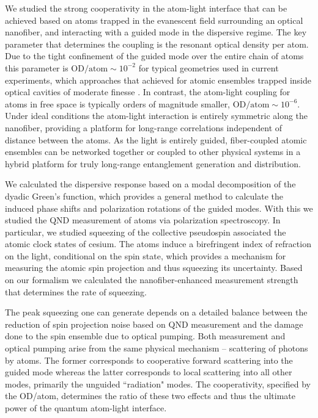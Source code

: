 \documentclass[aps,pra,twocolumn]{revtex4-1} %
\begin{document}
We studied the strong cooperativity in the atom-light interface that can be achieved based on atoms trapped in the evanescent field surrounding an optical nanofiber, and interacting with a guided mode in the dispersive regime. 
The key parameter that determines the coupling is the resonant optical density per atom. 
Due to the tight confinement of the guided mode over the entire chain of atoms this parameter is $ \mathrm{OD}/\mathrm{atom}\sim 10^{-2} $ for typical geometries used in current experiments, which approaches that achieved for atomic ensembles trapped inside optical cavities of moderate finesse \cite{chen_conditional_2011, zhang_collective_2012}.  
In contrast, the atom-light coupling for atoms in free space is typically orders of magnitude smaller, $ \mathrm{OD}/\mathrm{atom} \sim 10^{-6}$.  
Under ideal conditions the atom-light interaction is entirely symmetric along the nanofiber, providing a platform for long-range correlations independent of distance between the atoms. 
As the light is entirely guided, fiber-coupled atomic ensembles can be networked together or coupled to other physical systems in a hybrid platform \cite{hafezi_atomic_2012, liebermeister_tapered_2014} for truly long-range entanglement generation and distribution. 

We calculated the dispersive response based on a modal decomposition of the dyadic Green's function, which provides a general method to calculate the induced phase shifts and polarization rotations of the guided modes. 
With this we studied the QND measurement of atoms via polarization spectroscopy. 
In particular, we studied squeezing of the collective pseudospin associated the atomic clock states of cesium. 
The atoms induce a birefringent index of refraction on the light, conditional on the spin state, which provides a mechanism for measuring the atomic spin projection and thus squeezing its uncertainty.  
Based on our formalism we calculated the nanofiber-enhanced measurement strength that determines the rate of squeezing.  

The peak squeezing one can generate depends on a detailed balance between the reduction of spin projection noise based on QND measurement and the damage done to the spin ensemble due to optical pumping.  
Both measurement and optical pumping arise from the same physical mechanism -- scattering of photons by atoms.  
The former corresponds to cooperative forward scattering into the guided mode whereas the latter corresponds to local scattering into all other modes, primarily the unguided ``radiation" modes.   
The cooperativity, specified by the OD/atom, determines the ratio of these two effects and thus the ultimate power of the quantum atom-light interface. 
\end{document}
